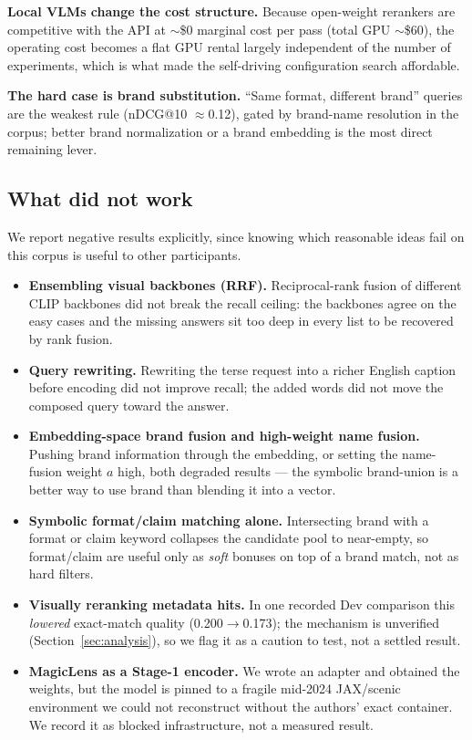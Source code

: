 \documentclass[sigconf,nonacm]{acmart}
\begin{document}
\textbf{Local VLMs change the cost structure.} Because open-weight rerankers
are competitive with the API at $\sim$\$0 marginal cost per pass (total GPU
$\sim$\$60), the operating cost becomes a flat GPU rental largely independent
of the number of experiments, which is what made the self-driving
configuration search affordable.

\textbf{The hard case is brand substitution.} ``Same format, different
brand'' queries are the weakest rule (nDCG@10 $\approx$0.12), gated by
brand-name resolution in the corpus; better brand normalization or a brand
embedding is the most direct remaining lever.

\subsection{What did not work}
We report negative results explicitly, since knowing which reasonable ideas
fail on this corpus is useful to other participants.
\begin{itemize}
\item \textbf{Ensembling visual backbones (RRF).} Reciprocal-rank fusion of
different CLIP backbones did not break the recall ceiling: the backbones
agree on the easy cases and the missing answers sit too deep in every list
to be recovered by rank fusion.
\item \textbf{Query rewriting.} Rewriting the terse request into a richer
English caption before encoding did not improve recall; the added words did
not move the composed query toward the answer.
\item \textbf{Embedding-space brand fusion and high-weight name fusion.}
Pushing brand information through the embedding, or setting the name-fusion
weight $a$ high, both degraded results --- the symbolic brand-union is a
better way to use brand than blending it into a vector.
\item \textbf{Symbolic format/claim matching alone.} Intersecting brand with
a format or claim keyword collapses the candidate pool to near-empty, so
format/claim are useful only as \emph{soft} bonuses on top of a brand match,
not as hard filters.
\item \textbf{Visually reranking metadata hits.} In one recorded Dev
comparison this \emph{lowered} exact-match quality (0.200$\to$0.173); the
mechanism is unverified (Section~\ref{sec:analysis}), so we flag it as a
caution to test, not a settled result.
\item \textbf{MagicLens as a Stage-1 encoder.} We wrote an adapter and
obtained the weights, but the model is pinned to a fragile mid-2024
JAX/scenic environment we could not reconstruct without the authors' exact
container. We record it as blocked infrastructure, not a measured result.
\end{itemize}
\end{document}
